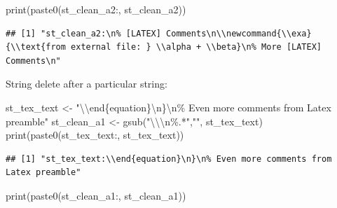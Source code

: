 \documentclass[
]{book}
\newenvironment{Shaded}{\begin{snugshade}}{\end{snugshade}}
\newcommand{\FunctionTok}[1]{\textcolor[rgb]{0.00,0.00,0.00}{#1}}
\newcommand{\NormalTok}[1]{#1}
\newcommand{\OtherTok}[1]{\textcolor[rgb]{0.56,0.35,0.01}{#1}}
\newcommand{\SpecialCharTok}[1]{\textcolor[rgb]{0.00,0.00,0.00}{#1}}
\newcommand{\StringTok}[1]{\textcolor[rgb]{0.31,0.60,0.02}{#1}}
\begin{document}
\begin{Shaded}
\begin{Highlighting}[]
\FunctionTok{print}\NormalTok{(}\FunctionTok{paste0}\NormalTok{(}\StringTok{\textquotesingle{}st\_clean\_a2:\textquotesingle{}}\NormalTok{, st\_clean\_a2))}
\end{Highlighting}
\end{Shaded}

\begin{verbatim}
## [1] "st_clean_a2:\n% [LATEX] Comments\n\\newcommand{\\exa}{\\text{from external file: } \\alpha + \\beta}\n% More [LATEX] Comments\n"
\end{verbatim}

String delete after a particular string:

\begin{Shaded}
\begin{Highlighting}[]
\NormalTok{st\_tex\_text }\OtherTok{\textless{}{-}} \StringTok{"}\SpecialCharTok{\textbackslash{}\textbackslash{}}\StringTok{end\{equation\}}\SpecialCharTok{\textbackslash{}n}\StringTok{\}}\SpecialCharTok{\textbackslash{}n}\StringTok{\% Even more comments from Latex preamble"}
\NormalTok{st\_clean\_a1 }\OtherTok{\textless{}{-}} \FunctionTok{gsub}\NormalTok{(}\StringTok{"}\SpecialCharTok{\textbackslash{}\textbackslash{}\textbackslash{}n}\StringTok{\%.*"}\NormalTok{,}\StringTok{""}\NormalTok{, st\_tex\_text)}
\FunctionTok{print}\NormalTok{(}\FunctionTok{paste0}\NormalTok{(}\StringTok{\textquotesingle{}st\_tex\_text:\textquotesingle{}}\NormalTok{, st\_tex\_text))}
\end{Highlighting}
\end{Shaded}

\begin{verbatim}
## [1] "st_tex_text:\\end{equation}\n}\n% Even more comments from Latex preamble"
\end{verbatim}

\begin{Shaded}
\begin{Highlighting}[]
\FunctionTok{print}\NormalTok{(}\FunctionTok{paste0}\NormalTok{(}\StringTok{\textquotesingle{}st\_clean\_a1:\textquotesingle{}}\NormalTok{, st\_clean\_a1))}
\end{Highlighting}
\end{Shaded}
\end{document}
